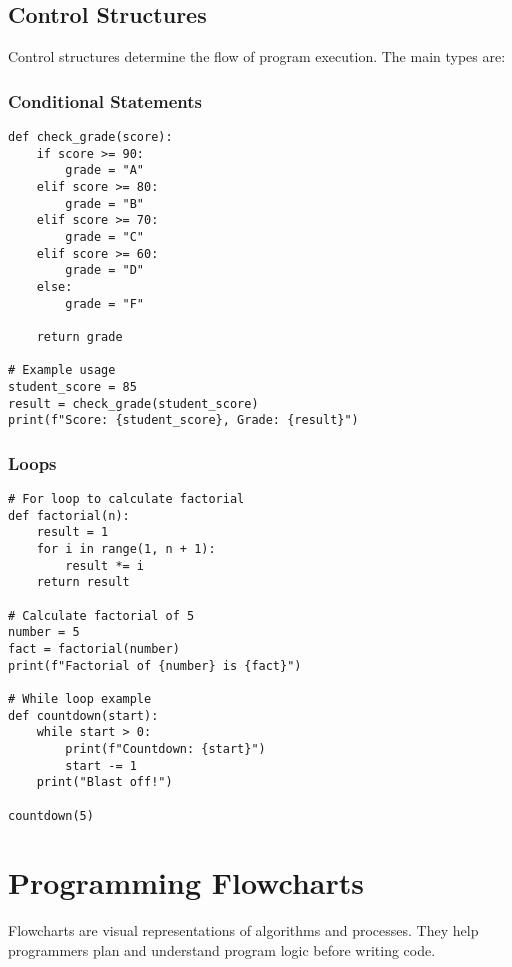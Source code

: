 \documentclass[12pt,a4paper]{article}
\begin{document}
\subsection{Control Structures}

Control structures determine the flow of program execution. The main types are:

\subsubsection{Conditional Statements}

\begin{codebox}{}
\begin{lstlisting}[style=python]
def check_grade(score):
    if score >= 90:
        grade = "A"
    elif score >= 80:
        grade = "B"
    elif score >= 70:
        grade = "C"
    elif score >= 60:
        grade = "D"
    else:
        grade = "F"
    
    return grade

# Example usage
student_score = 85
result = check_grade(student_score)
print(f"Score: {student_score}, Grade: {result}")
\end{lstlisting}
\end{codebox}

\subsubsection{Loops}

\begin{codebox}{}
\begin{lstlisting}[style=python]
# For loop to calculate factorial
def factorial(n):
    result = 1
    for i in range(1, n + 1):
        result *= i
    return result

# Calculate factorial of 5
number = 5
fact = factorial(number)
print(f"Factorial of {number} is {fact}")

# While loop example
def countdown(start):
    while start > 0:
        print(f"Countdown: {start}")
        start -= 1
    print("Blast off!")

countdown(5)
\end{lstlisting}
\end{codebox}

\section{Programming Flowcharts}

Flowcharts are visual representations of algorithms and processes. They help programmers plan and understand program logic before writing code.
\end{document}
